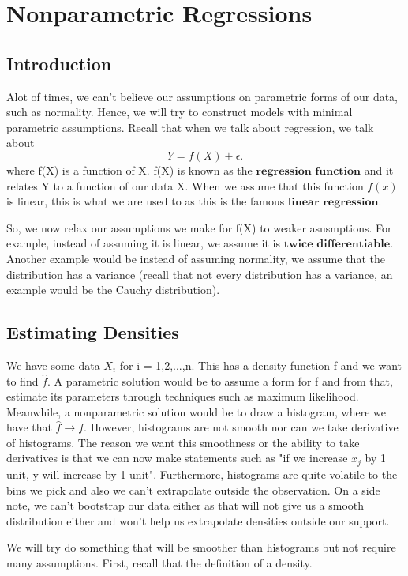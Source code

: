 \documentclass[twoside]{article}
\begin{document}
\section{Nonparametric Regressions}
\subsection{Introduction}

Alot of times, we can't believe our assumptions on parametric forms of our data, such as normality. Hence, we will try to construct models with minimal parametric assumptions. Recall that when we talk about regression, we talk about
$$
Y = f(X) + \epsilon.
$$
where f(X) is a function of X. f(X) is known as the $\textbf{regression function}$ and it relates Y to a function of our data X.  When we assume that this function $f(x)$ is linear, this is what we are used to as this is the famous $\textbf{linear regression}$.

So, we now relax our assumptions we make for f(X) to weaker asusmptions. For example, instead of assuming it is linear, we assume it is $\textbf{twice differentiable}$. Another example would be instead of assuming normality, we assume that the distribution has a variance (recall that not every distribution has a variance, an example would be the Cauchy distribution).

\subsection{Estimating Densities}

We have some data $X_i$ for i = 1,2,...,n. This has a density function f and we want to find $\hat{f}$. A parametric solution would be to assume a form for f and from that, estimate its parameters through techniques such as maximum likelihood. Meanwhile, a nonparametric solution would be to draw a histogram, where we have that $\hat{f} \rightarrow f$. However, histograms are not smooth nor can we take derivative of histograms. The reason we want this smoothness or the ability to take derivatives is that we can now make statements such as "if we increase $x_j$ by 1 unit, y will increase by 1 unit". Furthermore, histograms are quite volatile to the bins we pick and also we can't extrapolate outside the observation. On a side note, we can't bootstrap our data either as that will not give us a smooth distribution either and won't help us extrapolate densities outside our support. 

We will try do something that will be smoother than histograms but not require many assumptions. First, recall that the definition of a density.
\end{document}
